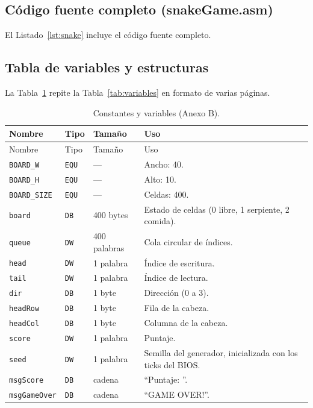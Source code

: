 \documentclass[10pt]{article}
\begin{document}
\subsection{Código fuente completo (snakeGame.asm)}
El Listado~\ref{lst:snake} incluye el código fuente completo.


\subsection{Tabla de variables y estructuras}
La Tabla~\ref{tab:variablesB} repite la Tabla~\ref{tab:variables} en formato de varias páginas.

\begin{longtable}{@{}p{2.8cm}p{1.4cm}p{2.2cm}p{6.8cm}@{}}
\caption{Constantes y variables (Anexo B).}\label{tab:variablesB}\\
\toprule
Nombre & Tipo & Tamaño & Uso \\
\midrule
\endfirsthead
\toprule
Nombre & Tipo & Tamaño & Uso \\
\midrule
\endhead
\bottomrule
\endfoot
\texttt{BOARD\_W} & \texttt{EQU} & --- & Ancho: 40. \\
\texttt{BOARD\_H} & \texttt{EQU} & --- & Alto: 10. \\
\texttt{BOARD\_SIZE} & \texttt{EQU} & --- & Celdas: 400. \\
\texttt{board} & \texttt{DB} & 400 bytes & Estado de celdas (0 libre, 1 serpiente, 2 comida). \\
\texttt{queue} & \texttt{DW} & 400 palabras & Cola circular de índices. \\
\texttt{head} & \texttt{DW} & 1 palabra & Índice de escritura. \\
\texttt{tail} & \texttt{DW} & 1 palabra & Índice de lectura. \\
\texttt{dir} & \texttt{DB} & 1 byte & Dirección (0 a 3). \\
\texttt{headRow} & \texttt{DB} & 1 byte & Fila de la cabeza. \\
\texttt{headCol} & \texttt{DB} & 1 byte & Columna de la cabeza. \\
\texttt{score} & \texttt{DW} & 1 palabra & Puntaje. \\
\texttt{seed} & \texttt{DW} & 1 palabra & Semilla del generador, inicializada con los ticks del BIOS. \\
\texttt{msgScore} & \texttt{DB} & cadena & ``Puntaje: ''. \\
\texttt{msgGameOver} & \texttt{DB} & cadena & ``GAME OVER!''. \\
\end{longtable}
\end{document}
